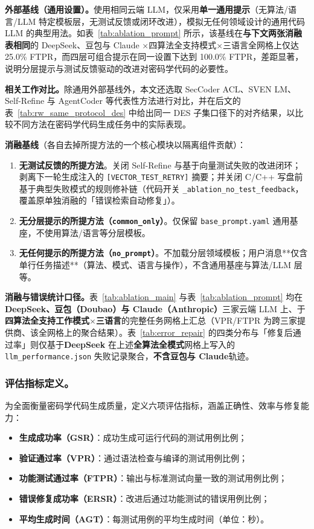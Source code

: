 \documentclass[12pt]{llncs}
\begin{document}
\textbf{外部基线（通用设置）。}使用相同云端 LLM，仅采用\textbf{单一通用提示}（无算法/语言/LLM 特定模板层，无测试反馈或闭环改进），模拟无任何领域设计的通用代码 LLM 的典型用法。如表~\ref{tab:ablation_prompt} 所示，该基线在\textbf{与下文两张消融表相同}的 DeepSeek、豆包与 Claude ×四算法全支持模式×三语言全网格上仅达 25.0\% FTPR，而四层可组合提示在同一设置下达到 100.0\% FTPR，差距显著，说明分层提示与测试反馈驱动的改进对密码学代码的必要性。

\textbf{相关工作对比。}除通用外部基线外，本文还选取 SecCoder ACL、SVEN LM、Self-Refine 与 AgentCoder 等代表性方法进行对比，并在后文的表~\ref{tab:rw_same_protocol_des} 中给出同一 DES 子集口径下的对齐结果，以比较不同方法在密码学代码生成任务中的实际表现。

\textbf{消融基线}（各自去掉所提方法的一个核心模块以隔离组件贡献）：
\begin{enumerate}[leftmargin=1.2em, labelsep=0.4em]
  \item \textbf{无测试反馈的所提方法}。关闭 Self-Refine 与基于向量测试失败的改进闭环；剥离下一轮生成注入的 \texttt{[VECTOR\_TEST\_RETRY]} 摘要；并关闭 C/C++ 写盘前基于典型失败模式的规则修补链（代码开关 \texttt{\_ablation\_no\_test\_feedback}，覆盖原单独消融的「错误检索自动修复」）。
  \item \textbf{无分层提示的所提方法（\texttt{common\_only}）}。仅保留 \texttt{base\_prompt.yaml} 通用基座，不使用算法/语言等分层模板。
  \item \textbf{无任何提示的所提方法（\texttt{no\_prompt}）}。不加载分层领域模板；用户消息**仅含单行任务描述**（算法、模式、语言与操作），不含通用基座与算法/LLM 层等。
\end{enumerate}

\textbf{消融与错误统计口径。}表~\ref{tab:ablation_main} 与表~\ref{tab:ablation_prompt} 均在\textbf{DeepSeek、豆包（Doubao）与 Claude（Anthropic）}三家云端 LLM 上、于\textbf{四算法全支持工作模式$\times$三语言}的完整任务网格上汇总（VPR/FTPR 为跨三家提供商、该全网格上的聚合结果）。表~\ref{tab:error_repair} 的四类分布与「修复后通过率」则仅基于\textbf{DeepSeek} 在上述\textbf{全算法全模式}网格上写入的 \texttt{llm\_performance.json} 失败记录聚合，\textbf{不含豆包与 Claude}轨迹。

\subsubsection{评估指标定义。}
为全面衡量密码学代码生成质量，定义六项评估指标，涵盖正确性、效率与修复能力：
\begin{itemize}[leftmargin=1.2em, labelsep=0.4em]
  \item \textbf{生成成功率（GSR）}：成功生成可运行代码的测试用例比例；
  \item \textbf{验证通过率（VPR）}：通过语法检查与编译的测试用例比例；
  \item \textbf{功能测试通过率（FTPR）}：输出与标准测试向量一致的测试用例比例；
  \item \textbf{错误修复成功率（ERSR）}：改进后通过功能测试的错误用例比例；
  \item \textbf{平均生成时间（AGT）}：每测试用例的平均生成时间（单位：秒）。
\end{itemize}
\end{document}
